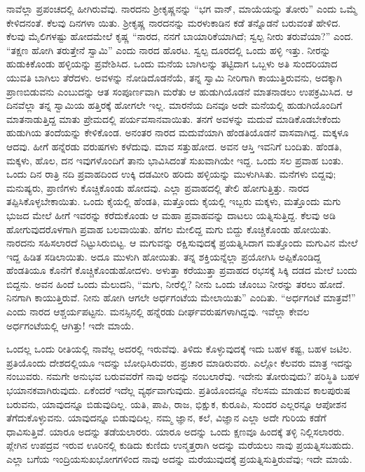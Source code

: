 ನಾವೆಲ್ಲಾ ಪ್ರಪಂಚದಲ್ಲಿ ಹೀಗಿರುವೆವು. ನಾರದನು ಶ‍್ರೀಕೃಷ್ಣನನ್ನು “ಭಗ ವಾನ್​, ಮಾಯೆಯನ್ನು ತೋರು” ಎಂದು ಒಮ್ಮೆ ಕೇಳಿದನಂತೆ. ಕೆಲವು ದಿನಗಳಾ ಯಿತು. ಶ‍್ರೀಕೃಷ್ಣ ನಾರದನನ್ನು ಮರಳುಕಾಡಿನ ಕಡೆ ತನ್ನೊಡನೆ ಬರುವಂತೆ ಹೇಳಿದ. ಕೆಲವು ಮೈಲಿಗಳಷ್ಟು ಹೋದಮೇಲೆ ಕೃಷ್ಣ “ನಾರದ, ನನಗೆ ಬಾಯಾರಿಕೆಯಾಗಿದೆ; ಸ್ವಲ್ಪ ನೀರು ತರುವೆಯಾ?” ಎಂದ. “ತಕ್ಷಣ ಹೋಗಿ ತರುತ್ತೇನೆ ಸ್ವಾಮಿ” ಎಂದು ನಾರದ ಹೊರಟ. ಸ್ವಲ್ಪ ದೂರದಲ್ಲಿ ಒಂದು ಹಳ್ಳಿ ಇತ್ತು. ನೀರನ್ನು ಹುಡುಕಿಕೊಂಡು ಹಳ್ಳಿಯನ್ನು ಪ್ರವೇಶಿಸಿದ. ಒಂದು ಮನೆಯ ಬಾಗಿಲನ್ನು ತಟ್ಟಿದಾಗ ಒಬ್ಬಳು ಅತಿ ಸುಂದರಿಯಾದ ಯುವತಿ ಬಾಗಿಲು ತೆರೆದಳು. ಅವಳನ್ನು ನೋಡಿದೊಡನೆಯೆ, ತನ್ನ ಸ್ವಾಮಿ ನೀರಿಗಾಗಿ ಕಾಯುತ್ತಿರುವನು, ಅದಕ್ಕಾಗಿ ಪ್ರಾಣಬಿಡುವನು ಎಂಬುದನ್ನು ಆತ ಸಂಪೂರ್ಣವಾಗಿ ಮರೆತು ಆ ಹುಡುಗಿಯೊಡನೆ ಮಾತನಾಡಲು ಉಪಕ್ರಮಿಸಿದ. ಆ ದಿನವೆಲ್ಲಾ ತನ್ನ ಸ್ವಾಮಿಯ ಹತ್ತಿರಕ್ಕೆ ಹೋಗಲೇ ಇಲ್ಲ. ಮಾರನೆಯ ದಿನವೂ ಅದೇ ಮನೆಯಲ್ಲಿ ಹುಡುಗಿಯೊಂದಿಗೆ ಮಾತನಾಡುತ್ತಿದ್ದ ಮಾತು ಪ್ರೇಮದಲ್ಲಿ ಪರ್ಯವಸಾನವಾಯಿತು. ತನಗೆ ಅವಳನ್ನು ಮದುವೆ ಮಾಡಿಕೊಡಬೇಕೆಂದು ಹುಡುಗಿಯ ತಂದೆಯನ್ನು ಕೇಳಿಕೊಂಡ. ಅನಂತರ ನಾರದ ಮದುವೆಯಾಗಿ ಹೆಂಡತಿಯೊಡನೆ ವಾಸವಾಗಿದ್ದ. ಮಕ್ಕಳೂ ಆದವು. ಹೀಗೆ ಹನ್ನೆರಡು ವರುಷಗಳು ಕಳೆದುವು. ಮಾವ ಸತ್ತುಹೋದ. ಅವನ ಆಸ್ತಿ ಇವನಿಗೆ ಬಂದಿತು. ಹೆಂಡತಿ, ಮಕ್ಕಳು, ಹೊಲ, ದನ ಇವುಗಳೊಂದಿಗೆ ತಾನು ಭಾವಿಸಿದಂತೆ ಸುಖವಾಗಿಯೇ ಇದ್ದ. ಒಂದು ಸಲ ಪ್ರವಾಹ ಬಂತು. ಒಂದು ದಿನ ರಾತ್ರಿ ನದಿ ಪ್ರವಾಹದಿಂದ ಉಕ್ಕಿ ದಡಮೀರಿ ಹರಿದು ಹಳ್ಳಿಯನ್ನು ಮುಳುಗಿಸಿತು. ಮನೆಗಳು ಬಿದ್ದವು; ಮನುಷ್ಯರು, ಪ್ರಾಣಿಗಳು ಕೊಚ್ಚಿಕೊಂಡು ಹೋದವು. ಎಲ್ಲಾ ಪ್ರವಾಹದಲ್ಲಿ ತೇಲಿ ಹೋಗುತ್ತಿತ್ತು. ನಾರದ ತಪ್ಪಿಸಿಕೊಳ್ಳಬೇಕಾಯಿತು. ಒಂದು ಕೈಯಲ್ಲಿ ಹೆಂಡತಿ, ಮತ್ತೊಂದು ಕೈಯಲ್ಲಿ ಇಬ್ಬರು ಮಕ್ಕಳು, ಮತ್ತೊಂದು ಮಗು ಭುಜದ ಮೇಲೆ ಹೀಗೆ ಇವರನ್ನು ಕರೆದುಕೊಂಡು ಆ ಮಹಾ ಪ್ರವಾಹವನ್ನು ದಾಟಲು ಯತ್ನಿಸುತ್ತಿದ್ದ. ಕೆಲವು ಅಡಿ ಹೋಗುವುದರೊಳಗಾಗಿ ಪ್ರವಾಹ ಬಲವಾಯಿತು. ಹೆಗಲ ಮೇಲಿದ್ದ ಮಗು ಬಿದ್ದು ಕೊಚ್ಚಿಕೊಂಡು ಹೋಯಿತು. ನಾರದನು ಸಹಿಸಲಾರದೆ ನಿಟ್ಟುಸಿರುಬಿಟ್ಟ. ಆ ಮಗುವನ್ನು ರಕ್ಷಿಸುವುದಕ್ಕೆ ಪ್ರಯತ್ನಿಸಿದಾಗ ಮತ್ತೊಂದು ಮಗುವಿನ ಮೇಲೆ ಇದ್ದ ಹಿಡಿತ ಸಡಿಲಾಯಿತು. ಅದೂ ಮುಳುಗಿ ಹೋಯಿತು. ತನ್ನ ಶಕ್ತಿಯನ್ನೆಲ್ಲಾ ಪ್ರಯೋಗಿಸಿ ಅಪ್ಪಿಕೊಂಡಿದ್ದ ಹೆಂಡತಿಯೂ ಕೊನೆಗೆ ಕೊಚ್ಚಿಕೊಂಡುಹೋದಳು. ಅಳುತ್ತಾ ಕರೆಯುತ್ತಾ ಪ್ರವಾಹದ ರಭಸಕ್ಕೆ ಸಿಕ್ಕಿ ದಡದ ಮೇಲೆ ಬಂದು ಬಿದ್ದನು. ಅವನ ಹಿಂದೆ ಒಂದು ಮೆಲುದನಿ, “ಮಗು, ನೀರೆಲ್ಲಿ? ನೀನು ಒಂದು ಚೊಂಬು ನೀರನ್ನು ತರಲು ಹೋದೆ. ನಿನಗಾಗಿ ಕಾಯುತ್ತಿರುವೆ. ನೀನು ಹೋಗಿ ಆಗಲೇ ಅರ್ಧಗಂಟೆಯ ಮೇಲಾಯಿತು” ಎಂದಿತು. “ಅರ್ಧಗಂಟೆ ಮಾತ್ರವೆ!” ಎಂದು ನಾರದ ಆಶ್ಚರ್ಯಪಟ್ಟನು. ಮನಸ್ಸಿನಲ್ಲಿ ಹನ್ನೆರಡು ದೀರ್ಘವರುಷಗಳಾಗಿದ್ದವು. ಇವೆಲ್ಲಾ ಕೇವಲ ಅರ್ಧಗಂಟೆಯಲ್ಲಿ ಆಗಿತ್ತು! ಇದೇ ಮಾಯೆ.

ಒಂದಲ್ಲ ಒಂದು ರೀತಿಯಲ್ಲಿ ನಾವೆಲ್ಲ ಅದರಲ್ಲಿ ಇರುವೆವು. ತಿಳಿದು ಕೊಳ್ಳುವುದಕ್ಕೆ ಇದು ಬಹಳ ಕಷ್ಟ, ಬಹಳ ಜಟಿಲ. ಪ್ರತಿಯೊಂದು ದೇಶದಲ್ಲಿಯೂ ಇದನ್ನು ಬೋಧಿಸಿರುವರು, ಪ್ರಚಾರ ಮಾಡಿರುವರು. ಎಲ್ಲೋ ಕೆಲವರು ಮಾತ್ರ ಇದನ್ನು ನಂಬುವರು. ನಮಗೇ ಅನುಭವ ಬರುವವರೆಗೆ ನಾವು ಅದನ್ನು ನಂಬಲಾರೆವು. ಇದೇನು ತೋರುವುದು? ಪರಿಸ್ಥಿತಿ ಬಹಳ ಭಯಾನಕವಾಗಿರುವುದು. ಏಕೆಂದರೆ ಇದೆಲ್ಲ ವ್ಯರ್ಥವಾಗುವುದು. ಪ್ರತಿಯೊಂದನ್ನೂ ನೆಲಸಮ ಮಾಡುವ ಕಾಲಪುರುಷ ಬರುವನು, ಯಾವುದನ್ನೂ ಬಿಡುವುದಿಲ್ಲ. ಯತಿ, ಪಾಪಿ, ರಾಜ, ಭಿಕ್ಷುಕ, ಕುರೂಪಿ, ಸುಂದರ ಎಲ್ಲರನ್ನೂ ಆಪೋಶನ ತೆಗೆದುಕೊಳ್ಳುವನು. ಯಾವುದನ್ನೂ ಬಿಡುವುದಿಲ್ಲ. ನಮ್ಮ ಜ್ಞಾನ, ಕಲೆ, ವಿಜ್ಞಾನ ಎಲ್ಲಾ ಅದೇ ಗುರಿಯ ಕಡೆಗೆ ಧಾವಿಸುತ್ತಿವೆ. ಯಾರೂ ಅದನ್ನು ತಡೆಯಲಾರರು. ಯಾರೂ ಅದನ್ನು ಒಂದು ಕ್ಷಣವೂ ಹಿಂದಕ್ಕೆ ತಳ್ಳಿ ನಿಲ್ಲಿಸಲಾರರು. ಪ್ಲೇಗಿನ ಉಪದ್ರವ ಇರುವ ಊರಿನಲ್ಲಿ ಕುಡಿದು ಕುಣಿದು ಉನ್ಮತ್ತರಾಗಿ ಅದನ್ನು ಮರೆಯಲು ನಾವು ಪ್ರಯತ್ನಿಸಬಹುದು. ಎಲ್ಲಾ ಬಗೆಯ ಇಂದ್ರಿಯಸುಖಭೋಗಗಳಿಂದ ನಾವು ಅದನ್ನು ಮರೆಯುವುದಕ್ಕೆ ಪ್ರಯತ್ನಿಸುತ್ತಿರುವೆವು; ಇದೇ ಮಾಯೆ.

